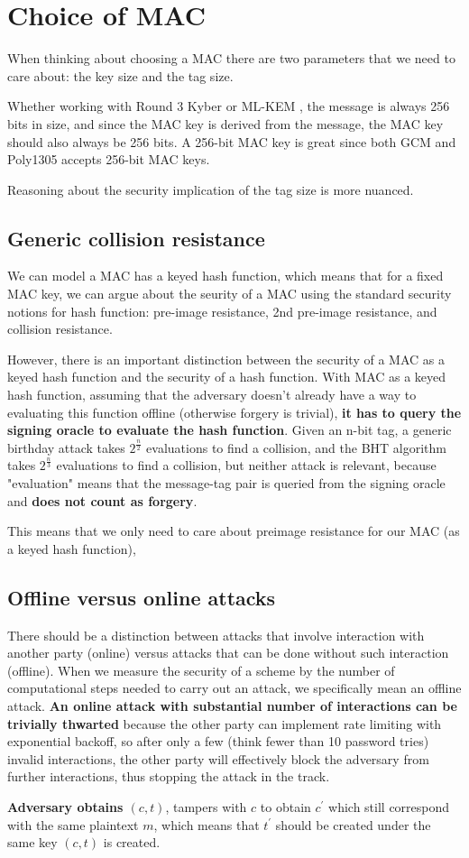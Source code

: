 \documentclass{article}
\begin{document}
\section{Choice of MAC}
When thinking about choosing a MAC there are two parameters that we need to care about: the key size and the tag size.

Whether working with Round 3 Kyber \cite{avanzi2019crystals} or ML-KEM \cite{key2023mechanism}, the message is always 256 bits in size, and since the MAC key is derived from the message, the MAC key should also always be 256 bits. A 256-bit MAC key is great since both GCM and Poly1305 accepts 256-bit MAC keys.

Reasoning about the security implication of the tag size is more nuanced.

\subsection{Generic collision resistance}
We can model a MAC has a keyed hash function, which means that for a fixed MAC key, we can argue about the seurity of a MAC using the standard security notions for hash function: pre-image resistance, 2nd pre-image resistance, and collision resistance.

However, there is an important distinction between the security of a MAC as a keyed hash function and the security of a hash function. With MAC as a keyed hash function, assuming that the adversary doesn't already have a way to evaluating this function offline (otherwise forgery is trivial), \textbf{it has to query the signing oracle to evaluate the hash function}. Given an n-bit tag, a generic birthday attack takes $2^{\frac{n}{2}}$ evaluations to find a collision, and the BHT algorithm \cite{brassard1997quantum} takes $2^{\frac{n}{3}}$ evaluations to find a collision, but neither attack is relevant, because "evaluation" means that the message-tag pair is queried from the signing oracle and \textbf{does not count as forgery}.

This means that we only need to care about preimage resistance for our MAC (as a keyed hash function), 

\subsection{Offline versus online attacks}
There should be a distinction between attacks that involve interaction with another party (online) versus attacks that can be done without such interaction (offline). When we measure the security of a scheme by the number of computational steps needed to carry out an attack, we specifically mean an offline attack. \textbf{An online attack with substantial number of interactions can be trivially thwarted} because the other party can implement rate limiting with exponential backoff, so after only a few (think fewer than 10 password tries) invalid interactions, the other party will effectively block the adversary from further interactions, thus stopping the attack in the track.

\textbf{Adversary obtains $(c, t)$}, tampers with $c$ to obtain $c^\prime$ which still correspond with the same plaintext $m$, which means that $t^\prime$ should be created under the same key $(c, t)$ is created.



\end{document}
